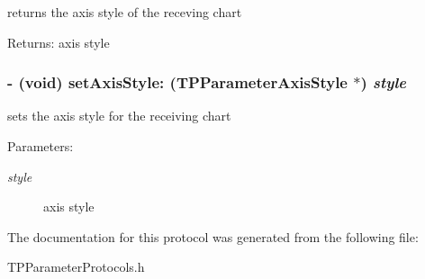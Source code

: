 returns the axis style of the receving chart \begin{Desc}
\item[Returns:]axis style \end{Desc}
\hypertarget{protocol_t_p_axis_style-p_2e524aea66679aa46e6456b64c9327ec}{
\subsubsection[{setAxisStyle:}]{\setlength{\rightskip}{0pt plus 5cm}- (void) setAxisStyle: ({\bf TPParameterAxisStyle} $\ast$) {\em style}}}
\label{protocol_t_p_axis_style-p_2e524aea66679aa46e6456b64c9327ec}


sets the axis style for the receiving chart \begin{Desc}
\item[Parameters:]
\begin{description}
\item[{\em style}]axis style \end{description}
\end{Desc}


The documentation for this protocol was generated from the following file:\begin{CompactItemize}
\item 
TPParameterProtocols.h\end{CompactItemize}
